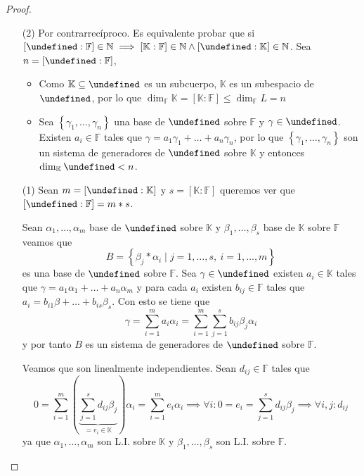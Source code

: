 \documentclass[10pt, spanish]{report}
\theoremstyle{definition}
\newcommand{\N}{\mathbb{N}}
\newcommand{\F}{\mathbb{F}}
\newcommand{\K}{\mathbb{K}}
\let\L\undefined
\newcommand{\L}{\mathbb{L}}
\renewcommand{\leq}{\leqslant}
\begin{document}
\begin{proof}\hspace{0pt}
    \begin{enumerate}
        \item[(2)] Por contrarrecíproco. Es equivalente probar que si
            $[\L:\F]\in \N\implies[\K:\F]\in \N \wedge[\L:\K]\in \N$. Sea
            $n=[\L:\F]$,
            \begin{itemize}
                \item Como $\K\subseteq\L$ es un subcuerpo, $\K$ es un
                    subespacio de $\L$, por lo que $\dim_\F{\K}=[\K:\F]\leq
                    \dim_\F{L}=n$
                \item Sea $\left\{ \gamma_1,\ldots,\gamma_n \right\}$ una base
                    de $\L$ sobre $\F$ y $\gamma\in \L$. Existen $a_i\in\F$ tales
                    que $\gamma=a_1\gamma_1+\ldots+a_n\gamma_n$, por lo que
                    $\left\{ \gamma_1,\ldots,\gamma_n \right\} $ son un sistema
                    de generadores de $\L$ sobre $\K$ y entonces
                    $\dim_\K{\L}<n$.
            \end{itemize}
        \item[(1)] Sean $m=[\L:\K]$ y $s=[\K:\F]$ queremos ver que
            $[\L:\F]=m*s$.

            Sean $\alpha_1,\ldots,\alpha_m$ base de $\L$ sobre
            $\K$ y $\beta_1,\ldots,\beta_s$ base de $\K$ sobre $\F$ veamos que
            \[B=\left\{\beta_j*\alpha_i\mid j=1,\ldots,s,\ i=1,\ldots,m\right\}\]
            es una base de $\L$ sobre $\F$. Sea $\gamma\in\L$ existen $a_i\in\K$
            tales que $\gamma=a_1\alpha_1+\ldots+a_n\alpha_m$ y para cada $a_i$
            existen $b_{ij}\in\F$ tales que $a_i=b_{i1}\beta+\ldots+b_{is}
            \beta_s$. Con esto se tiene que \[\gamma=\sum_{i=1}^{m}a_i\alpha_i=
            \sum_{i=1}^m\sum_{j=1}^sb_{ij}\beta_j\alpha_i\] y por tanto $B$ es
            un sistema de generadores de $\L$ sobre $\F$.

            Veamos que son linealmente independientes. Sean $d_{ij}\in\F$ tales
            que
            \[0=\sum_{i=1}^m(\underbrace{\sum_{j=1}^sd_{ij}\beta_j}_{=e_i\in\K})
            \alpha_i=\sum_{i=1}^me_i\alpha_i\implies\forall i: 0=e_i=\sum_{j=1}^sd_{ij}
            \beta_j\implies\forall i,j: d_{ij}\]
            ya que $\alpha_1,\ldots,\alpha_m$ son L.I. sobre $\K$ y
            $\beta_1,\ldots,\beta_s$ son L.I. sobre $\F$.
    \end{enumerate}
\end{proof}
\end{document}
